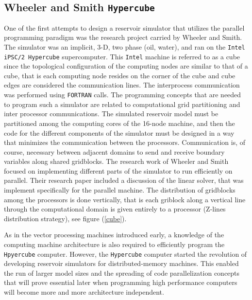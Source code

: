 \documentclass[barcolor=BrickRed,nocopyright,nolists]{asmejour}
\begin{document}
\subsection{Wheeler and Smith \texttt{Hypercube}}
One of the first attempts to design a reservoir simulator that utilizes the parallel programming paradigm was the research project carried by Wheeler and Smith\cite{spe19804}.
The simulator was an implicit, 3-D, two phase (oil, water), and ran on the \texttt{Intel iPSC/2 Hypercube} supercomputer. This \texttt{Intel} machine is referred to as a cube since 
the topological configuration of the computing nodes are similar to that of a cube, that is each computing node resides on the corner of the cube and cube edges are considered the 
communication lines. The interprocess communication was performed using \texttt{FORTRAN} calls. The programming concepts that are needed to program such
a simulator are related to computational grid partitioning and inter processor communications. The simulated reservoir model must be partitioned among the computing cores
of the 16-node machine, and then the code for the different components of the simulator must be designed in a way that minimizes the communication between the processors.
Communication is, of course, necessary between adjacent domains to send and receive boundary variables along shared gridblocks.
The research work of Wheeler and Smith focused on implementing different parts of the simulator to run efficiently on parallel. Their research paper included a discussion of
the linear solver, that was implement specifically for the parallel machine. The distribution of gridblocks among the processors is done vertically, that is each griblock along a vertical line
through the computational domain is given entirely to a processor (Z-lines distribution strategy), see figure (\ref{cube}).

As in the vector processing machines introduced early, a knowledge of the computing machine architecture is also required to efficiently program the \texttt{Hpyercube} computer\cite{duchark}.
However, the \texttt{Hypercube} computer started the revolution of developing reservoir simulators for distributed-memory machines. This enabled the run of larger model sizes and the spreading
of code parallelization concepts that will prove essential later when programming high performance computers will become more and more architecture independent.
\end{document}
